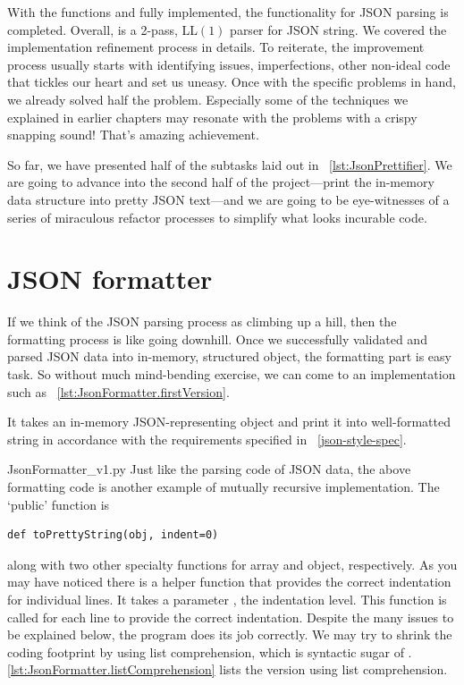 With the functions  and  fully implemented,
the functionality for JSON parsing is completed.
Overall,  is a 2-pass, LL$(1)$ parser for JSON string.
We covered the implementation refinement process in details.
To reiterate, the improvement process usually starts with identifying issues,
imperfections, other non-ideal code that tickles our heart and set us uneasy.
Once with the specific problems in hand, we already solved half the problem.
Especially some of the techniques we explained in earlier chapters may
resonate with the problems with a crispy snapping sound!
That's amazing achievement.

So far, we have presented half of the subtasks laid out in ~\autoref{lst:JsonPrettifier}.
We are going to advance into the second half of the project---print the in-memory data
structure into pretty JSON text---and we are going to be eye-witnesses of a series of
miraculous refactor processes to simplify what looks incurable code.

\section{JSON formatter}\label{sec:jsonFormatter}

If we think of the JSON parsing process as climbing up a hill, then
the formatting process is like going downhill.
Once we successfully validated and parsed JSON data into in-memory, structured object,
the formatting part is easy task.
So without much mind-bending exercise, we can come to an implementation such as
~\autoref{lst:JsonFormatter.firstVersion}.

It takes an in-memory JSON-representing object and print it into well-formatted string in
accordance with the requirements specified in ~\autoref{json-style-spec}.

{JsonFormatter_v1.py}
Just like the parsing code of JSON data, the above formatting code is another example of
mutually recursive implementation.
The `public' function is
\begin{lstlisting}[label={lst:toPrettyString}]
def toPrettyString(obj, indent=0)
\end{lstlisting}
along with two other specialty functions for array and object, respectively.
As you may have noticed there is a helper function  that provides
the correct indentation for individual lines.
It takes a parameter , the indentation level.
This function is called for each line to provide the correct indentation.
Despite the many issues to be explained below, the program does its job correctly.
We may try to shrink the coding footprint by using list comprehension, which is syntactic sugar of
\python.
\autoref{lst:JsonFormatter.listComprehension} lists the version using list comprehension.

